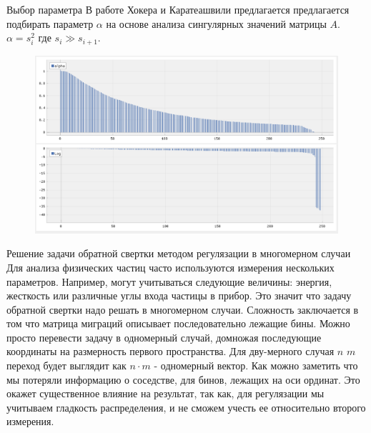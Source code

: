 \documentclass[fullscreen=true,russian,compress,%
	hyperref={unicode,bookmarks=false}]{presentation}
\begin{document}
\begin{frame}{Выбор параметра \alpha}
   В работе Хокера и Каратеашвили предлагается предлагается подбирать параметр $\alpha$ на основе анализа сингулярных значений матрицы $A$. 
   $\alpha = s^2_{i}$ где $ s_{i} \gg s_{i+1} $. 
   \begin{figure}[h]
      \includegraphics[width=\linewidth]{images/alpha.png}
      \label{photo:alpha}
   \end{figure}
\end{frame}


\begin{frame}{Решение задачи обратной свертки методом регулязации в многомерном случаи}
   Для анализа физических частиц часто используются измерения нескольких параметров. Например, могут учитываться следующие величины: 
   энергия, жесткость или различные углы входа частицы в прибор. Это значит что задачу обратной свертки надо решать в многомерном 
   случаи. Сложность заключается в том что матрица миграций описывает последовательно лежащие бины. Можно просто перевести задачу 
   в одномерный случай, домножая последующие координаты на размерность первого пространства. Для дву-мерного случая $n$ $m$ переход 
   будет выглядит как $n \cdot m$ - одномерный вектор. Как можно заметить что мы потеряли информацию о соседстве, для бинов, лежащих на
   оси ординат. Это окажет существенное влияние на результат, так как, для регулязации мы учитываем гладкость распределения, и не 
   сможем учесть ее относительно второго измерения.
\end{frame}
\end{document}
